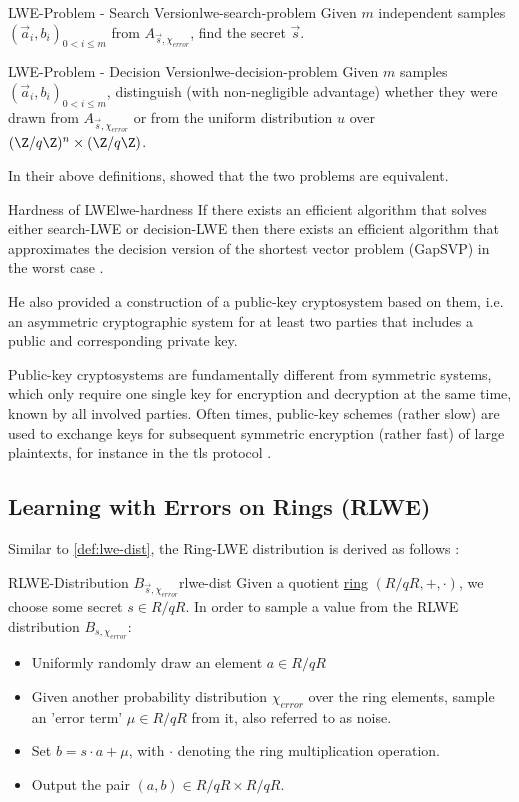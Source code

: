 \begin{definition}{LWE-Problem - Search Version}{lwe-search-problem}
  Given $m$ independent samples $(\vec{a}_i, b_i)_{0 < i \leq m}$ from $A_{\vec{s}, \chi_{error}}$, find the secret $\vec{s}$.
\end{definition}
\begin{definition}{LWE-Problem - Decision Version}{lwe-decision-problem}
  Given $m$ samples $(\vec{a}_i, b_i)_{0 < i \leq m}$, distinguish (with non-negligible advantage) whether they were drawn from $A_{\vec{s}, \chi_{error}}$ or from the uniform distribution $u$ over $(\Z / q \Z)^n \times (\Z / q \Z)$.
\end{definition}

In their above definitions, \citeauthor{2005-lwe-original} showed that the two problems are equivalent.

\begin{theorem}{Hardness of LWE}{lwe-hardness}
  If there exists an efficient algorithm that solves either search-LWE or decision-LWE then there exists an efficient algorithm that approximates the decision version of the shortest vector problem (GapSVP) in the worst case \parencite{2010-lwe-survey}.
\end{theorem}

He also provided a construction of a public-key cryptosystem based on them, i.e. an asymmetric cryptographic system for at least two parties that includes a public and corresponding private key.

Public-key cryptosystems are fundamentally different from symmetric systems, which only require one single key for encryption and decryption at the same time, known by all involved parties.
Often times, public-key schemes (rather slow) are used to exchange keys for subsequent symmetric encryption (rather fast) of large plaintexts, for instance in the \gls{tls} protocol \parencite{rfc8446}.

\subsection{Learning with Errors on Rings (RLWE)}
Similar to \cref{def:lwe-dist}, the Ring-LWE distribution is derived as follows \parencite{2010-rlwe-original}:

\begin{corollary}{RLWE-Distribution $B_{\vec{s}, \chi_{error}}$}{rlwe-dist}
  Given a quotient \hyperref[def:ring]{ring} $(R/qR, +, \cdot)$, we choose some secret $s \in R/qR$.
  In order to sample a value from the RLWE distribution $B_{s, \chi_{error}}$:
  \begin{itemize}
    \item Uniformly randomly draw an element $a \in R/qR$
    \item Given another probability distribution $\chi_{error}$ over the ring elements, sample an 'error term' $\mu \in R/qR$ from it, also referred to as noise.
    \item Set $b = s \cdot a + \mu$, with $\cdot$ denoting the ring multiplication operation.
    \item Output the pair $(a, b) \in R/qR \times R/qR$.
  \end{itemize}
\end{corollary}


